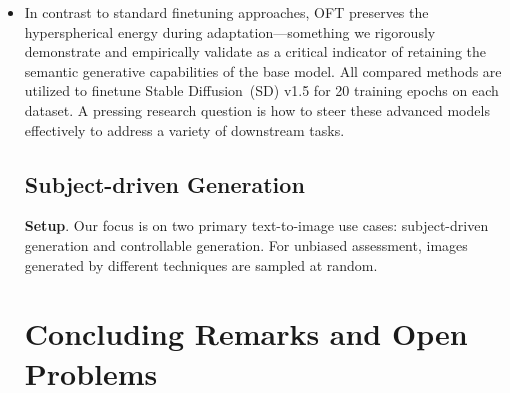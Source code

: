 \begin{itemize}[leftmargin=*,nosep]
\begin{equation}
    \footnotesize
    \bm{R}=\text{diag}(\bm{R}_1,\bm{R}_2,\cdots,\bm{R}_r)=\begin{bmatrix}
    \bm{R}_1\in \text{O}(\frac{d}{r}) &  &\\
    &\ddots & \\
    & & \bm{R}_r\in \text{O}(\frac{d}{r})
    \end{bmatrix}\in \text{O}(d)
\end{equation}

Here, $\text{O}(d)$ represents the group of orthogonal transformations in $d$ dimensions. Although alternative angular manipulations could introduce greater flexibility by assigning unique rotation angles to different neurons, our experiments indicate that orthogonal transformations strike an optimal balance between expressiveness and structural coherence. To further clarify the significance of neuron angles, we design a toy experiment as illustrated in Figure~\ref{fig:toy_ae}, wherein a conventional convolutional autoencoder is trained using flower image data. This method can also be interpreted as modifying the standard coordinate system of the neurons within a layer. \item In contrast to standard finetuning approaches, OFT preserves the hyperspherical energy during adaptation—something we rigorously demonstrate and empirically validate as a critical indicator of retaining the semantic generative capabilities of the base model. All compared methods are utilized to finetune Stable Diffusion~(SD) v1.5 for 20 training epochs on each dataset. A pressing research question is how to steer these advanced models effectively to address a variety of downstream tasks. \subsection{Subject-driven Generation}

\textbf{Setup}. Our focus is on two primary text-to-image use cases: subject-driven generation and controllable generation. For unbiased assessment, images generated by different techniques are sampled at random. \section{Concluding Remarks and Open Problems}


\end{itemize}
